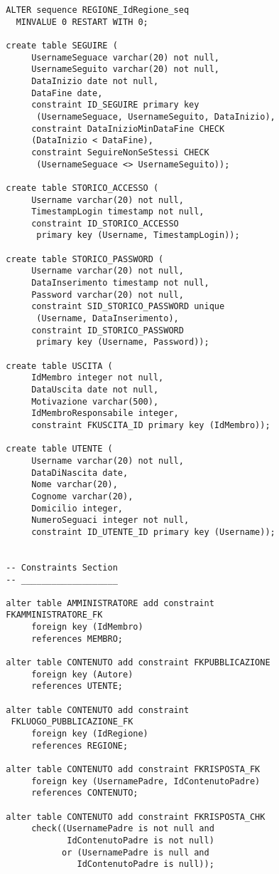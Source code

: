 \documentclass[a4paper,12pt]{report}
\begin{document}
\begin{lstlisting}
  ALTER sequence REGIONE_IdRegione_seq 
    MINVALUE 0 RESTART WITH 0;
  
  create table SEGUIRE (
       UsernameSeguace varchar(20) not null,
       UsernameSeguito varchar(20) not null,
       DataInizio date not null,
       DataFine date,
       constraint ID_SEGUIRE primary key 
        (UsernameSeguace, UsernameSeguito, DataInizio),
       constraint DataInizioMinDataFine CHECK 
       (DataInizio < DataFine),
       constraint SeguireNonSeStessi CHECK 
        (UsernameSeguace <> UsernameSeguito));
        
  create table STORICO_ACCESSO (
       Username varchar(20) not null,
       TimestampLogin timestamp not null,
       constraint ID_STORICO_ACCESSO 
        primary key (Username, TimestampLogin));
  
  create table STORICO_PASSWORD (
       Username varchar(20) not null,
       DataInserimento timestamp not null,
       Password varchar(20) not null,
       constraint SID_STORICO_PASSWORD unique 
        (Username, DataInserimento),
       constraint ID_STORICO_PASSWORD 
        primary key (Username, Password));
  
  create table USCITA (
       IdMembro integer not null,
       DataUscita date not null,
       Motivazione varchar(500),
       IdMembroResponsabile integer,
       constraint FKUSCITA_ID primary key (IdMembro));
  
  create table UTENTE (
       Username varchar(20) not null,
       DataDiNascita date,
       Nome varchar(20),
       Cognome varchar(20),
       Domicilio integer,
       NumeroSeguaci integer not null,
       constraint ID_UTENTE_ID primary key (Username));
  
  
  -- Constraints Section
  -- ___________________ 
  
  alter table AMMINISTRATORE add constraint 
  FKAMMINISTRATORE_FK
       foreign key (IdMembro)
       references MEMBRO;
  
  alter table CONTENUTO add constraint FKPUBBLICAZIONE
       foreign key (Autore)
       references UTENTE;
  
  alter table CONTENUTO add constraint
   FKLUOGO_PUBBLICAZIONE_FK
       foreign key (IdRegione)
       references REGIONE;
  
  alter table CONTENUTO add constraint FKRISPOSTA_FK
       foreign key (UsernamePadre, IdContenutoPadre)
       references CONTENUTO;
  
  alter table CONTENUTO add constraint FKRISPOSTA_CHK
       check((UsernamePadre is not null and 
              IdContenutoPadre is not null)
             or (UsernamePadre is null and
                IdContenutoPadre is null)); 
  

\end{lstlisting}
\end{document}
